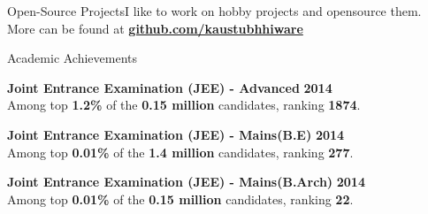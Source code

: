 \documentclass{resume} %
\begin{document}
\begin{rSection}{\large Open-Source Projects}{}{I like to work on hobby projects and opensource them. More can be found at \textbf{\href{https://github.com/kaustubhhiware}{github.com/kaustubhhiware}}}

\end{rSection}



\begin{rSection}{Academic Achievements}

{\bf \large Joint Entrance Examination (JEE) - Advanced} \hfill \textbf{2014} \\ 
Among top \textbf{1.2\%} of the \textbf{0.15 million} candidates, ranking \textbf{1874}.

{\bf \large Joint Entrance Examination (JEE) - Mains(B.E)} \hfill \textbf{2014} \\ 
Among top \textbf{0.01\%} of the \textbf{1.4 million} candidates, ranking \textbf{277}.

{\bf \large Joint Entrance Examination (JEE) - Mains(B.Arch)} \hfill \textbf{2014} \\ 
Among top \textbf{0.01\%} of the \textbf{0.15 million} candidates, ranking \textbf{22}.

\end{rSection}

\end{document}
